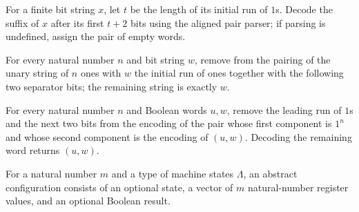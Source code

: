 \begin{definition}
\label{Complexity.LogProg.pairWords}
\leanok
{}
For a finite bit string $x$, let $t$ be the length of its initial run of $1$s. Decode
the suffix of $x$ after its first $t+2$ bits using the aligned pair parser; if parsing
is undefined, assign the pair of empty words.
\end{definition}

\begin{lemma}
\label{Complexity.LogProg.plainWord_pairEncode}
\leanok
{}
For every natural number $n$ and bit string $w$, remove from the pairing of the unary
string of $n$ ones with $w$ the initial run of ones together with the following two
separator bits; the remaining string is exactly $w$.
\end{lemma}

\begin{lemma}
\label{Complexity.LogProg.pairWords_pairEncode}
\leanok
{}
For every natural number $n$ and Boolean words $u,w$, remove the leading run of $1$s and
the next two bits from the encoding of the pair whose first component is $1^n$ and whose
second component is the encoding of $(u,w)$. Decoding the remaining word returns
$(u,w)$.
\end{lemma}

\begin{definition}
\label{Complexity.LogProg.AConf}
\leanok
For a natural number $m$ and a type of machine states $\Lambda$, an abstract
configuration consists of an optional state, a vector of $m$ natural-number register
values, and an optional Boolean result.
\end{definition}

